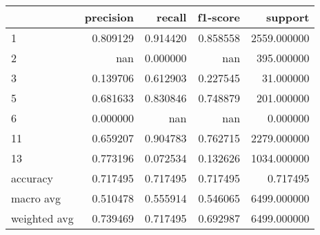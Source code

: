 \begin{tabular}{lrrrr}
\toprule
 & precision & recall & f1-score & support \\
\midrule
1 & 0.809129 & 0.914420 & 0.858558 & 2559.000000 \\
2 & nan & 0.000000 & nan & 395.000000 \\
3 & 0.139706 & 0.612903 & 0.227545 & 31.000000 \\
5 & 0.681633 & 0.830846 & 0.748879 & 201.000000 \\
6 & 0.000000 & nan & nan & 0.000000 \\
11 & 0.659207 & 0.904783 & 0.762715 & 2279.000000 \\
13 & 0.773196 & 0.072534 & 0.132626 & 1034.000000 \\
accuracy & 0.717495 & 0.717495 & 0.717495 & 0.717495 \\
macro avg & 0.510478 & 0.555914 & 0.546065 & 6499.000000 \\
weighted avg & 0.739469 & 0.717495 & 0.692987 & 6499.000000 \\
\bottomrule
\end{tabular}
